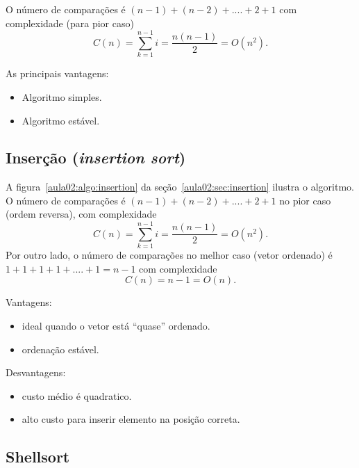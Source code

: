 
O número de comparações é $(n-1)+(n-2)+....+2+1$ com complexidade (para pior caso)
\begin{equation*}
C(n) = \sum_{k=1}^{n-1} i = \frac{n(n-1)}{2} = O(n^2).
\end{equation*}

As principais vantagens:
\begin{itemize}
\item Algoritmo simples.
\item Algoritmo estável.
\end{itemize}

\subsection{Inserção (\emph{insertion sort})}

A figura~\ref{aula02:algo:insertion} da seção~\ref{aula02:sec:insertion} ilustra
o algoritmo.
%
O número de comparações é $(n-1)+(n-2)+....+2+1$ no pior caso (ordem reversa), com complexidade
\begin{equation*}
C(n) = \sum_{k=1}^{n-1} i = \frac{n(n-1)}{2} = O(n^2).
\end{equation*}
Por outro lado, o número de comparações no melhor caso (vetor ordenado) é 
$1 + 1 + 1 + 1+ .... + 1 = n-1$ com complexidade
\begin{equation*}
C(n) = n - 1  = O(n).
\end{equation*}


Vantagens:
\begin{itemize}
\item ideal quando o vetor está ``quase'' ordenado.
\item ordenação estável.
\end{itemize}
Desvantagens:
\begin{itemize}
\item custo médio é quadratico.
\item alto custo para inserir elemento na posição correta.
\end{itemize}

\subsection{Shellsort}


